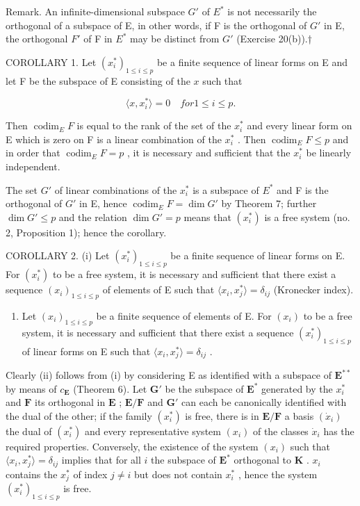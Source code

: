 Remark. An infinite-dimensional subspace \(G'\) of \(E^{*}\) is not necessarily the orthogonal of a subspace of E, in other words, if F is the orthogonal of \(G'\) in E, the orthogonal \(F'\) of F in \(E^{*}\) may be distinct from \(G'\) (Exercise 20(b)).†

COROLLARY 1. Let \((x_{i}^{*})_{1\leqslant i\leqslant p}\) be a finite sequence of linear forms on E and let F be the subspace of E consisting of the \(x\) such that

\[
\langle x, x _ {i} ^ {*} \rangle = 0 \quad for 1 \leqslant i \leqslant p.
\]

Then \(\operatorname{codim}_{E} F\) is equal to the rank of the set of the \(x_{i}^{*}\) and every linear form on E which is zero on F is a linear combination of the \(x_{i}^{*}\) . Then \(\operatorname{codim}_{E} F \leqslant p\) and in order that \(\operatorname{codim}_{E} F = p\) , it is necessary and sufficient that the \(x_{i}^{*}\) be linearly independent.

The set \(G'\) of linear combinations of the \(x_{i}^{*}\) is a subspace of \(E^{*}\) and F is the orthogonal of \(G'\) in E, hence \(\operatorname{codim}_{E} F = \dim G'\) by Theorem 7; further \(\dim G' \leqslant p\) and the relation \(\dim G' = p\) means that \((x_{i}^{*})\) is a free system (no. 2, Proposition 1); hence the corollary.

COROLLARY 2. (i) Let \((x_{i}^{*})_{1\leqslant i\leqslant p}\) be a finite sequence of linear forms on E. For \((x_{i}^{*})\) to be a free system, it is necessary and sufficient that there exist a sequence \((x_{i})_{1\leqslant i\leqslant p}\) of elements of E such that \(\langle x_i,x_j^*\rangle = \delta_{ij}\) (Kronecker index).

\begin{enumerate}
\def\labelenumi{(\roman{enumi})}
\setcounter{enumi}{1}
\tightlist
\item
  Let \((x_{i})_{1\leqslant i\leqslant p}\) be a finite sequence of elements of E. For \((x_{i})\) to be a free system, it is necessary and sufficient that there exist a sequence \((x_{i}^{*})_{1\leqslant i\leqslant p}\) of linear forms on E such that \(\langle x_i,x_j^*\rangle = \delta_{ij}\) .
\end{enumerate}

Clearly (ii) follows from (i) by considering E as identified with a subspace of \(\mathbf{E}^{**}\) by means of \(c_{\mathbf{E}}\) (Theorem 6). Let \(\mathbf{G}'\) be the subspace of \(\mathbf{E}^*\) generated by the \(x_{i}^{*}\) and \(\mathbf{F}\) its orthogonal in \(\mathbf{E}\) ; \(\mathbf{E} / \mathbf{F}\) and \(\mathbf{G}'\) can each be canonically identified with the dual of the other; if the family \((x_{i}^{*})\) is free, there is in \(\mathbf{E} / \mathbf{F}\) a basis \((\dot{x}_i)\) the dual of \((x_{i}^{*})\) and every representative system \((x_{i})\) of the classes \(\dot{x}_{i}\) has the required properties. Conversely, the existence of the system \((x_{i})\) such that \(\langle x_{i}, x_{j}^{*} \rangle = \delta_{ij}\) implies that for all \(i\) the subspace of \(\mathbf{E}^*\) orthogonal to \(\mathbf{K}\) . \(x_{i}\) contains the \(x_{j}^{*}\) of index \(j \neq i\) but does not contain \(x_{i}^{*}\) , hence the system \((x_{i}^{*})_{1 \leqslant i \leqslant p}\) is free.

